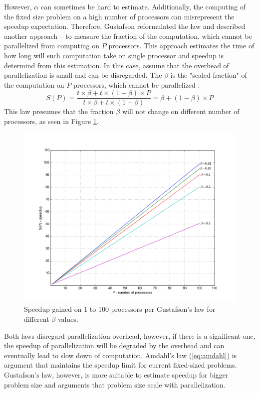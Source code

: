 However, $\alpha$ can sometimes be hard to estimate. Additionally, the computing of the fixed size problem on a high number of processors can misrepresent the speedup expectation. Therefore, Gustafson reformulated the law and described another approach -- to measure the fraction of the computation, which cannot be parallelized from computing on $P$ processors. This approach estimates the time of how long will such computation take on single processor and speedup is determind from this estimation. In this case, assume that the overhead of parallelization is small and can be disregarded. The $\beta$ is the "scaled fraction" of the computation on $P$ processors, which cannot be parallelized \cite{Gustafson1988}:
\begin{equation} \label{eq:gustafson}
S(P) = \frac{t \times \beta + t\times(1-\beta)\times P}{t\times\beta+t\times(1-\beta)} = \beta + (1-\beta)\times P 
\end{equation}
This law presumes that the fraction $\beta$ will not change on different number of processors, as seen in Figure \ref{fig:gustafson}.
\begin{figure}[ht]
    \centering
    \includegraphics[width=1\textwidth]{chapter2/Gustafson.png}
    \caption{Speedup gained on 1 to 100 processors per Gustafson's law for different $\beta$ values.}
    \label{fig:gustafson}
\end{figure}

Both laws disregard parallelization overhead, however, if there is a significant one, the speedup of parallelization will be degraded by the overhead and can eventually lead to slow down of computation. Amdahl's law (\ref{eq:amdahl}) is argument that maintains the speedup limit for current fixed-sized problems. Gustafson's law, however, is more suitable to estimate speedup for bigger problem size and arguments that problem size scale with parallelization.

